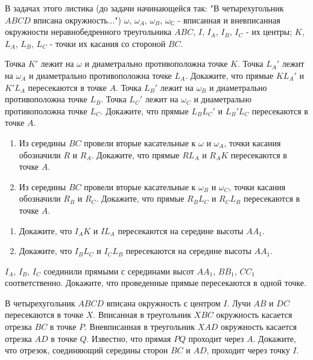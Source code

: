 В задачах этого листика (до задачи начинающейся так: "В четырехугольник $ABCD$ вписана окружность...") $\omega$, $\omega_{A}$, $\omega_{B}$, $\omega_{С}$ - вписанная и вневписанная окружности неравнобедренного треугольника $ABC$, $I$, $I_A$, $I_B$, $I_C$ - их центры; $K$, $L_A$, $L_B$, $L_C$ - точки их касания со стороной $BC$.

\item
\sp
Точка $K'$ лежит на $\omega$ и диаметрально противоположна точке $K$. Точка $L_A'$ лежит на $\omega_A$ и диаметрально противоположна точке $L_A$. Докажите, что прямые $KL_A'$ и $K'L_A$ пересекаются в точке $A$.
\sp
Точка $L_B'$ лежит на $\omega_B$ и диаметрально противоположна точке $L_B$. Точка $L_C'$ лежит на $\omega_C$ и диаметрально противоположна точке $L_C$. Докажите, что прямые $L_BL_C'$ и $L_B'L_C$ пересекаются в точке $A$.

\item
\begin{enumerate}
\item
Из середины $BC$ провели вторые касательные к $\omega$ и $\omega_A$, точки касания обозначили $R$ и $R_A$. Докажите, что прямые $RL_A$ и $R_AK$ пересекаются в точке $A$.
\item
Из середины $BC$ провели вторые касательные к $\omega_B$ и $\omega_C$, точки касания обозначили $R_B$ и $R_C$. Докажите, что прямые $R_BL_C$ и $R_CL_B$ пересекаются в точке $A$.
\end{enumerate}

\item
\begin{enumerate}
\item
Докажите, что $I_AK$ и $IL_A$ пересекаются на середине высоты $AA_1$.
\item
Докажите, что $I_BL_C$ и $I_CL_B$ пересекаются на середине высоты $AA_1$.
\end{enumerate}

\item
$I_A$, $I_B$, $I_C$ соединили прямыми с серединами высот $AA_1$, $BB_1$, $CC_1$ соответственно. Докажите, что проведенные прямые пересекаются в одной точке.

\item
В четырехугольник $ABCD$ вписана окружность с центром $I$. Лучи $AB$ и $DC$ пересекаются в точке $X$. Вписанная в треугольник $XBC$ окружность касается отрезка $BC$ в точке $P$. Вневписанная в треугольник $XAD$ окружность касается отрезка $AD$ в точке $Q$. Известно, что прямая $PQ$ проходит через $A$. Докажите, что отрезок, соединяющий середины сторон $BC$ и $AD$, проходит через точку $I$.

\fi %

